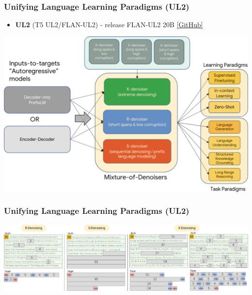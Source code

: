 \documentclass{beamer}
\begin{document}
\begin{frame}
    \frametitle{Unifying Language Learning Paradigms (UL2)}
    \begin{itemize}
    	    \item \textbf{UL2} (T5 UL2/FLAN-UL2) - release FLAN-UL2 20B \href{https://github.com/google-research/google-research/tree/master/ul2}{[GitHub]}
    \end{itemize}
    \begin{center}
        \includegraphics[scale=0.95]{img/ul2.png}
    \end{center}
\end{frame}

\begin{frame}
    \frametitle{Unifying Language Learning Paradigms (UL2)}
    \begin{center}
        \includegraphics[scale=1.1]{img/ul2_masking.png}
    \end{center}
\end{frame}
\end{document}
